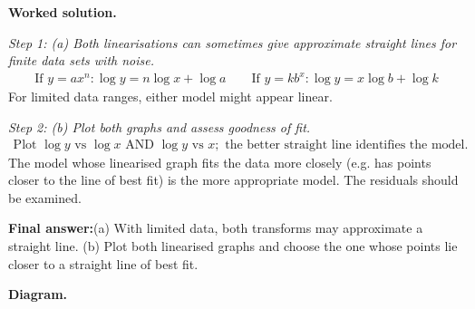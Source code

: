 \documentclass[11pt]{article}
\begin{document}
\textbf{Worked solution.}

\textit{Step 1: (a) Both linearisations can sometimes give approximate straight lines for finite data sets with noise.}
\[\begin{gathered}
\text{If } y = ax^n: \log y = n\log x + \log a \qquad \text{If } y = kb^x: \log y = x\log b + \log k
\end{gathered}\]
For limited data ranges, either model might appear linear.

\textit{Step 2: (b) Plot both graphs and assess goodness of fit.}
\[\begin{gathered}
\text{Plot } \log y \text{ vs } \log x \text{ AND } \log y \text{ vs } x; \text{ the better straight line identifies the model.}
\end{gathered}\]
The model whose linearised graph fits the data more closely (e.g. has points closer to the line of best fit) is the more appropriate model. The residuals should be examined.

\begin{answerbox}
\textbf{Final answer:}\quad (a) With limited data, both transforms may approximate a straight line. (b) Plot both linearised graphs and choose the one whose points lie closer to a straight line of best fit.
\end{answerbox}
\textbf{Diagram.}
\end{document}

